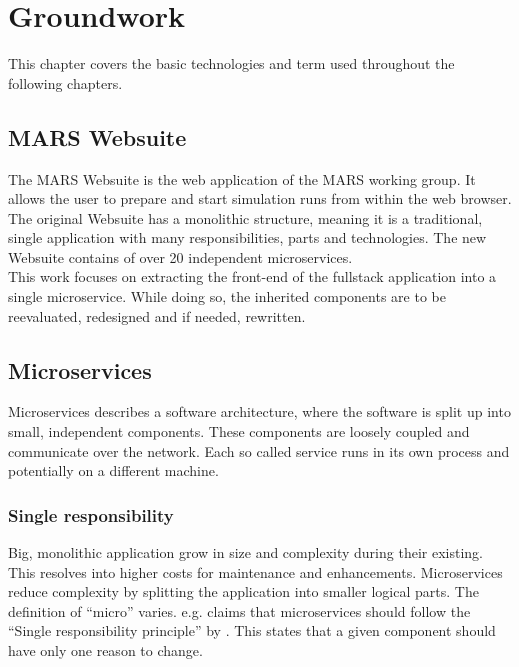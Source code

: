 
\chapter{Groundwork}
This chapter covers the basic technologies and term used throughout the following chapters.



\section{MARS Websuite}
The MARS Websuite is the web application of the MARS working group. It allows the user to prepare and start simulation runs from within the web browser.\\
The original Websuite has a monolithic structure, meaning it is a traditional, single application with many responsibilities, parts and technologies. The new Websuite contains of over 20 independent microservices.\\
This work focuses on extracting the front-end of the fullstack application into a single microservice. While doing so, the inherited components are to be reevaluated, redesigned and if needed, rewritten.



\section{Microservices}
\label{sec:microservices}
Microservices describes a software architecture, where the software is split up into small, independent components. These components are loosely coupled and communicate over the network. Each so called service runs in its own process and potentially on a different machine.


\subsection{Single responsibility}
Big, monolithic application grow in size and complexity during their existing. This resolves into higher costs for maintenance and enhancements. Microservices reduce complexity by splitting the application into smaller logical parts. The definition of \enquote{micro} varies. \cite{newman2015building} e.g. claims that microservices should follow the \enquote{Single responsibility principle} by \cite{martin2003agile}. This states that a given component should have only one reason to change.



